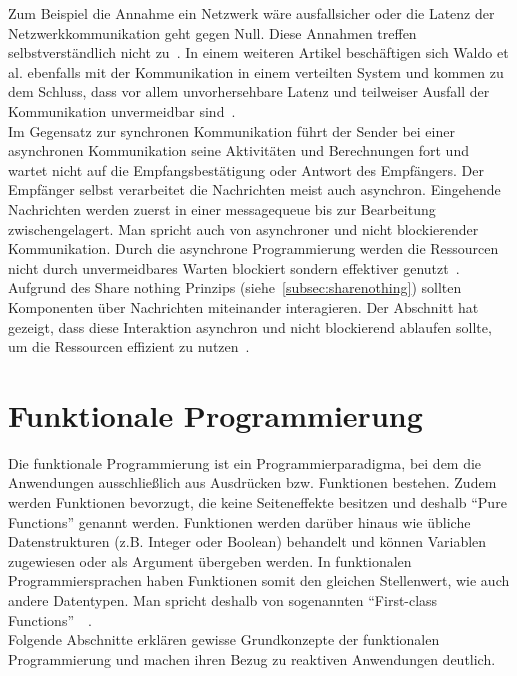 Zum Beispiel die Annahme ein Netzwerk wäre ausfallsicher oder die Latenz der Netzwerkkommunikation geht gegen Null. Diese Annahmen treffen selbstverständlich nicht zu~\cite[S.~1]{rotem_fallacies_2008}. In einem weiteren Artikel beschäftigen sich Waldo et al. ebenfalls mit der Kommunikation in einem verteilten System und kommen zu dem Schluss, dass vor allem unvorhersehbare Latenz und teilweiser Ausfall der Kommunikation unvermeidbar sind~\cite{waldo_note_1994}.\\
Im Gegensatz zur synchronen Kommunikation führt der Sender bei einer asynchronen Kommunikation seine Aktivitäten und Berechnungen fort und wartet nicht auf die Empfangsbestätigung oder Antwort des Empfängers. Der Empfänger selbst verarbeitet die Nachrichten meist auch asynchron. Eingehende Nachrichten werden zuerst in einer \gls{messagequeue} bis zur Bearbeitung zwischengelagert. Man spricht auch von asynchroner und nicht blockierender Kommunikation. Durch die asynchrone Programmierung werden die Ressourcen nicht durch unvermeidbares Warten blockiert sondern effektiver genutzt~\cite[S.~48]{kuhn_reactive_2015}.\\

Aufgrund des Share nothing Prinzips (siehe~\ref{subsec:sharenothing}) sollten Komponenten über Nachrichten miteinander interagieren. Der Abschnitt hat gezeigt, dass diese Interaktion asynchron und nicht blockierend ablaufen sollte, um die Ressourcen effizient zu nutzen~\cite[S.~48~\&~S.~49]{kuhn_reactive_2015}.

\pagebreak

\section{Funktionale Programmierung}
Die funktionale Programmierung ist ein Programmierparadigma, bei dem die Anwendungen ausschließlich aus Ausdrücken bzw. Funktionen bestehen. Zudem werden Funktionen bevorzugt, die keine Seiteneffekte besitzen und deshalb \enquote{Pure Functions} genannt werden. Funktionen werden darüber hinaus wie übliche Datenstrukturen (z.B. Integer oder Boolean) behandelt und können Variablen zugewiesen oder als Argument übergeben werden. In funktionalen Programmiersprachen haben Funktionen somit den gleichen Stellenwert, wie auch andere Datentypen. Man spricht deshalb von sogenannten \enquote{First-class Functions}~\cite[S.~50]{butcher_seven_2014}~\cite[S.~3~\&~S.~19]{chiusano_functional_2015}.\\
Folgende Abschnitte erklären gewisse Grundkonzepte der funktionalen Programmierung und machen ihren Bezug zu reaktiven Anwendungen deutlich. 

